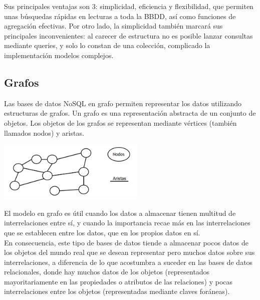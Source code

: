 \documentclass[twoside,twocolumn]{article}
\begin{document}
Sus principales ventajas son 3: simplicidad, eficiencia y flexibilidad, que permiten unas búsquedas rápidas en lecturas a toda la BBDD, así como funciones de agregación efectivas. Por otro lado, la simplicidad también marcará sus principales inconvenientes: al carecer de estructura no es posible lanzar consultas mediante queries, y solo lo constan de una colección, complicado la implementación modelos complejos.


\subsection{Grafos}

Las bases de datos NoSQL en grafo permiten representar los datos utilizando estructuras de grafos. Un grafo es una representación abstracta de un conjunto de objetos. Los objetos de los grafos se representan mediante vértices (también llamados nodos) y aristas.

\begin{center}
	\includegraphics[width=7cm]{./Imagenes/nodos_aristas} 
\end{center}

El modelo en grafo es útil cuando los datos a almacenar tienen multitud de interrelaciones entre sí, y cuando la importancia recae más en las interrelaciones que se establecen entre los datos, que en los propios datos en sí. 
\\
En consecuencia, este tipo de bases de datos tiende a almacenar pocos datos de los objetos del mundo real que se desean representar pero muchos datos sobre sus interrelaciones, a diferencia de lo que acostumbra a suceder en las bases de datos relacionales, donde hay muchos datos de los objetos (representados mayoritariamente en las propiedades o atributos de las relaciones) y pocas interrelaciones entre los objetos (representadas mediante claves foráneas). 
\end{document}
